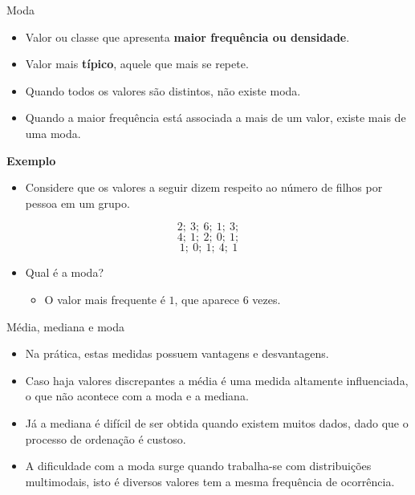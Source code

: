 \documentclass[
  ignorenonframetext,
  serif,
  professionalfont,
  usenames,
  dvipsnames,
  aspectratio = 169]{beamer}
\providecommand{\tightlist}{%
  \setlength{\itemsep}{0pt}\setlength{\parskip}{0pt}}
\renewcommand{\tightlist}{%
  \setlength{\itemsep}{0\baselineskip}
  \setlength{\parskip}{0.25\baselineskip}
}
\def\beginAHalfColumn{\begin{minipage}{0.49\textwidth}}%
\def\endColumns{\end{minipage}}%
\begin{document}
\begin{frame}{Moda}
\protect\hypertarget{moda}{}
\beginAHalfColumn

\begin{itemize}
\tightlist
\item
  Valor ou classe que apresenta \textbf{maior frequência ou densidade}.
\item
  Valor mais \textbf{típico}, aquele que mais se repete.
\item
  Quando todos os valores são distintos, não existe moda.
\item
  Quando a maior frequência está associada a mais de um valor, existe
  mais de uma moda.
\end{itemize}

\endColumns
\beginAHalfColumn

\textbf{Exemplo}

\begin{itemize}
\tightlist
\item
  Considere que os valores a seguir dizem respeito ao número de filhos
  por pessoa em um grupo.
\end{itemize}

\[2;\ 3;\ 6;\ 1;\ 3;\] \[4;\ 1;\ 2;\ 0;\ 1;\] \[1;\ 0;\ 1;\ 4;\ 1\]

\begin{itemize}
\tightlist
\item
  Qual é a moda?

  \begin{itemize}
  \tightlist
  \item
    O valor mais frequente é \(1\), que aparece 6 vezes.
  \end{itemize}
\end{itemize}

\endColumns
\end{frame}

\begin{frame}{Média, mediana e moda}
\protect\hypertarget{muxe9dia-mediana-e-moda}{}
\begin{itemize}
\item
  Na prática, estas medidas possuem vantagens e desvantagens.
\item
  Caso haja valores discrepantes a média é uma medida altamente
  influenciada, o que não acontece com a moda e a mediana.
\item
  Já a mediana é difícil de ser obtida quando existem muitos dados, dado
  que o processo de ordenação é custoso.
\item
  A dificuldade com a moda surge quando trabalha-se com distribuições
  multimodais, isto é diversos valores tem a mesma frequência de
  ocorrência.
\end{itemize}
\end{frame}
\end{document}
